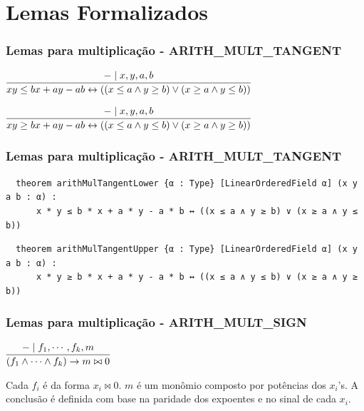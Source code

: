 \documentclass[usepdftitle=false,aspectratio=169,usenames,dvipsnames]{beamer}
\begin{document}
\section{Lemas Formalizados}


\begin{frame}
  \frametitle{Lemas para multiplicação - ARITH\_MULT\_TANGENT}

\begin{center}
  $\infer[]{xy \le bx + ay - ab \leftrightarrow ((x \le a \land y \ge b) \lor (x \ge a \land y \le b))}{- \mid x, y, a, b}$
\end{center}

\begin{center}
  $\infer[]{xy \ge bx + ay - ab \leftrightarrow ((x \le a \land y \le b) \lor (x \ge a \land y \ge b))}{- \mid x, y, a, b}$
\end{center}

\end{frame}

\begin{frame}[fragile]
  \frametitle{Lemas para multiplicação - ARITH\_MULT\_TANGENT}

  \begin{lstlisting}
  theorem arithMulTangentLower {α : Type} [LinearOrderedField α] (x y a b : α) :
      x * y ≤ b * x + a * y - a * b ↔ ((x ≤ a ∧ y ≥ b) ∨ (x ≥ a ∧ y ≤ b))
  \end{lstlisting}

  \begin{lstlisting}
  theorem arithMulTangentUpper {α : Type} [LinearOrderedField α] (x y a b : α) :
      x * y ≥ b * x + a * y - a * b ↔ ((x ≤ a ∧ y ≤ b) ∨ (x ≥ a ∧ y ≥ b))
  \end{lstlisting}

\end{frame}

\begin{frame}
  \frametitle{Lemas para multiplicação - ARITH\_MULT\_SIGN}

\begin{center}
  $\infer[]{(f_{1} \land \cdots \land f_{k}) \rightarrow m \bowtie 0}{- \mid f_{1}, \cdots, f_{k}, m}$
\end{center}
Cada $f_{i}$ é da forma $x_{i} \bowtie 0$. $m$ é um monômio composto por potências dos $x_{i}$'s. A conclusão é definida com base na paridade dos expoentes e no sinal de cada $x_{i}$.
\end{frame}
\end{document}
